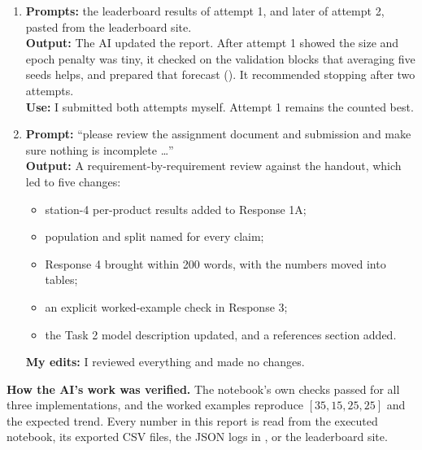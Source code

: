 \begin{enumerate}
  \item \textbf{Prompts:} the leaderboard results of attempt 1, and later of attempt 2, pasted from the leaderboard site.\\
  \textbf{Output:} The AI updated the report. After attempt 1 showed the size and epoch penalty was tiny, it checked on the validation blocks that averaging five seeds helps, and prepared that forecast (). It recommended stopping after two attempts.\\
  \textbf{Use:} I submitted both attempts myself. Attempt 1 remains the counted best.

  \item \textbf{Prompt:} ``please review the assignment document and submission and make sure nothing is incomplete \ldots''\\
  \textbf{Output:} A requirement-by-requirement review against the handout, which led to five changes:
  \begin{itemize}
    \item station-4 per-product results added to Response 1A;
    \item population and split named for every claim;
    \item Response 4 brought within 200 words, with the numbers moved into tables;
    \item an explicit worked-example check in Response 3;
    \item the Task 2 model description updated, and a references section added.
  \end{itemize}

  \textbf{My edits:} I reviewed everything and made no changes.
\end{enumerate}

\textbf{How the AI's work was verified.} The notebook's own checks passed for all three implementations, and the worked examples reproduce $[35,15,25,25]$ and the expected trend. Every number in this report is read from the executed notebook, its exported CSV files, the JSON logs in , or the leaderboard site.
